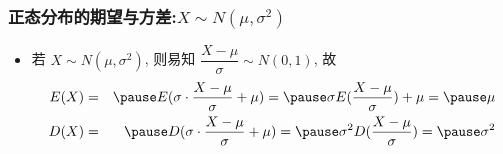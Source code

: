 \documentclass[Prob-All.tex]{subfiles}
\begin{document}
	\begin{frame}
		\frametitle{正态分布的期望与方差:$X\sim N (\mu,\sigma^2)$}
		\begin{itemize}
			\item 若 $X\sim N (\mu,\sigma^2)$, 则易知 $\dfrac{X-\mu}{\sigma}\sim N (0,1)$, 故
			\begin{eqnarray*}
				E(X)&=&\pause E(\sigma \cdot \dfrac{X-\mu}{\sigma}+\mu )=\pause \sigma E(\dfrac{X-\mu}{\sigma})+\mu=\pause \mu\\
				D(X)&=&\pause D(\sigma \cdot \dfrac{X-\mu}{\sigma}+\mu )=\pause \sigma^2 D(\dfrac{X-\mu}{\sigma})=\pause \sigma^2
			\end{eqnarray*}

		\end{itemize}
	\end{frame}
\end{document}
